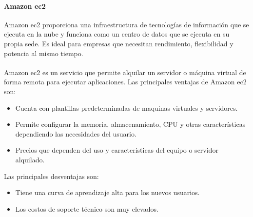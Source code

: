 \documentclass[12pt, a4paper, titlepage]{report}
\begin{document}

		   	\paragraph{Amazon \acrshort{ec2} \\}
		   	Amazon \acrfull{ec2} \cite{amazon_ec2} proporciona una infraestructura de tecnologías de información que se ejecuta en la nube y funciona como un centro de datos que se ejecuta en su propia sede. Es ideal para empresas que necesitan rendimiento, flexibilidad y potencia al mismo tiempo.\\\\
		   	Amazon \acrshort{ec2} es un servicio que permite alquilar un servidor o máquina virtual de forma remota para ejecutar aplicaciones.	
		   	Las principales ventajas de Amazon \acrshort{ec2} son: 
		   	\begin{itemize}
		   		\item Cuenta con plantillas predeterminadas de maquinas virtuales y servidores.
		   		\item Permite configurar la memoria, almacenamiento, CPU y otras características dependiendo las necesidades del usuario.
		   		\item Precios que dependen del uso y características del equipo o servidor alquilado.
		   	\end{itemize}
		   	
		   	Las principales desventajas son: 
		   	\begin{itemize}
		   		\item Tiene una curva de aprendizaje alta para los nuevos usuarios.
		   		\item Los costos de soporte técnico son muy elevados.
		   	\end{itemize}		
		   	
\end{document}
